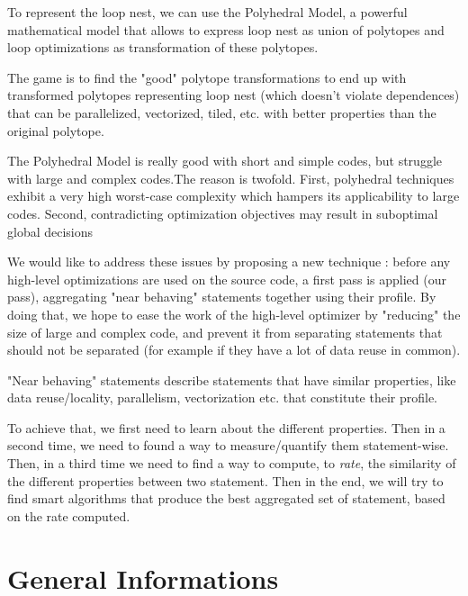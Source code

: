 \documentclass[paper=a4, fontsize=11pt]{scrartcl}
\numberwithin{equation}{section}        %
\numberwithin{figure}{section}          %
\numberwithin{table}{section}               %
\begin{document}
To represent the loop nest, we can use the Polyhedral Model, a powerful mathematical model
that allows to express loop nest as union of polytopes and loop optimizations as
transformation of these polytopes.

The game is to find the "good" polytope transformations to end up with
transformed polytopes representing loop nest (which doesn't violate dependences) 
that can be parallelized, vectorized, tiled, etc. with better properties than the original
polytope.

The Polyhedral Model is really good with short and simple codes, but struggle with
large and complex codes.The reason is twofold. First, polyhedral techniques exhibit
a very high worst-case complexity which hampers its applicability to large codes.
Second, contradicting optimization objectives may result in suboptimal global
decisions


We would like to address these issues by proposing a new technique : before any
high-level optimizations are used on the source code, a first pass is applied (our pass),
aggregating "near behaving" statements together using their profile.
By doing that, we hope to ease the work of the high-level optimizer by "reducing" the size
of large and complex code, and prevent it from separating statements that should
not be separated (for example if they have a lot of data reuse in common).

"Near behaving" statements describe statements that have similar properties,
like data reuse/locality, parallelism, vectorization etc. that constitute their profile.

To achieve that, we first need to learn about the different properties. Then in a second
time, we need to found a way to measure/quantify them statement-wise. Then, in a third
time we need to find a way to compute, to \textit{rate}, the similarity of the different
properties between two statement. Then in the end, we will try to find smart algorithms
that produce the best aggregated set of statement, based on the rate computed.


\section{General Informations}
\end{document}
